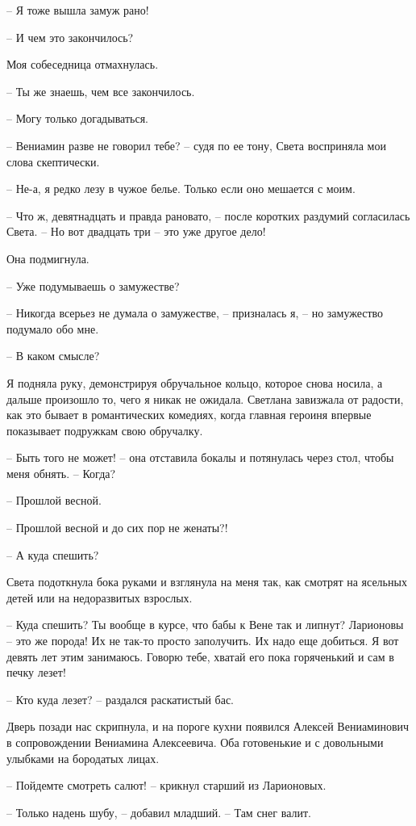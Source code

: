 \documentclass[
]{book}
\begin{document}
-- Я тоже вышла замуж рано!

-- И чем это закончилось?

Моя собеседница отмахнулась.

-- Ты же знаешь, чем все закончилось.

-- Могу только догадываться.

-- Вениамин разве не говорил тебе? -- судя по ее тону, Света восприняла мои слова скептически.

-- Не-а, я редко лезу в чужое белье. Только если оно мешается с моим.

-- Что ж, девятнадцать и правда рановато, -- после коротких раздумий согласилась Света. -- Но вот двадцать три -- это уже другое дело!

Она подмигнула.

-- Уже подумываешь о замужестве?

-- Никогда всерьез не думала о замужестве, -- призналась я, -- но замужество подумало обо мне.

-- В каком смысле?

Я подняла руку, демонстрируя обручальное кольцо, которое снова носила, а дальше произошло то, чего я никак не ожидала. Светлана завизжала от радости, как это бывает в романтических комедиях, когда главная героиня впервые показывает подружкам свою обручалку.

-- Быть того не может! -- она отставила бокалы и потянулась через стол, чтобы меня обнять. -- Когда?

-- Прошлой весной.

-- Прошлой весной и до сих пор не женаты?!

-- А куда спешить?

Света подоткнула бока руками и взглянула на меня так, как смотрят на ясельных детей или на недоразвитых взрослых.

-- Куда спешить? Ты вообще в курсе, что бабы к Вене так и липнут? Ларионовы -- это же порода! Их не так-то просто заполучить. Их надо еще добиться. Я вот девять лет этим занимаюсь. Говорю тебе, хватай его пока горяченький и сам в печку лезет!

-- Кто куда лезет? -- раздался раскатистый бас.

Дверь позади нас скрипнула, и на пороге кухни появился Алексей Вениаминович в сопровождении Вениамина Алексеевича. Оба готовенькие и с довольными улыбками на бородатых лицах.

-- Пойдемте смотреть салют! -- крикнул старший из Ларионовых.

-- Только надень шубу, -- добавил младший. -- Там снег валит.
\end{document}
